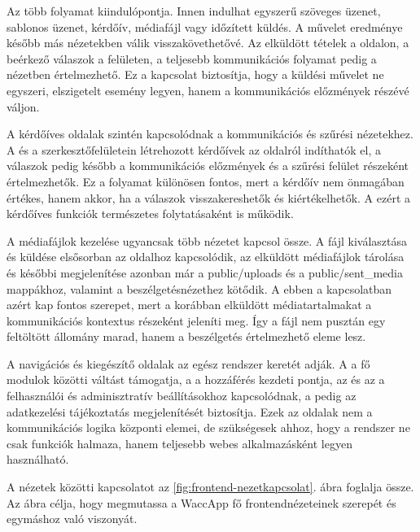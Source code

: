 Az  több folyamat kiindulópontja. Innen indulhat egyszerű szöveges üzenet, sablonos üzenet, kérdőív, médiafájl vagy időzített küldés. A művelet eredménye később más nézetekben válik visszakövethetővé. Az elküldött tételek a  oldalon, a beérkező válaszok a  felületen, a teljesebb kommunikációs folyamat pedig a  nézetben értelmezhető. Ez a kapcsolat biztosítja, hogy a küldési művelet ne egyszeri, elszigetelt esemény legyen, hanem a kommunikációs előzmények részévé váljon. 

A kérdőíves oldalak szintén kapcsolódnak a kommunikációs és szűrési nézetekhez. A  és a  szerkesztőfelületein létrehozott kérdőívek az  oldalról indíthatók el, a válaszok pedig később a kommunikációs előzmények és a szűrési felület részeként értelmezhetők. Ez a folyamat különösen fontos, mert a kérdőív nem önmagában értékes, hanem akkor, ha a válaszok visszakereshetők és kiértékelhetők. A  ezért a kérdőíves funkciók természetes folytatásaként is működik. 

A médiafájlok kezelése ugyancsak több nézetet kapcsol össze. A fájl kiválasztása és küldése elsősorban az  oldalhoz kapcsolódik, az elküldött médiafájlok tárolása és későbbi megjelenítése azonban már a public/uploads és a public/sent\_media mappákhoz, valamint a beszélgetésnézethez kötődik. A  ebben a kapcsolatban azért kap fontos szerepet, mert a korábban elküldött médiatartalmakat a kommunikációs kontextus részeként jeleníti meg. Így a fájl nem pusztán egy feltöltött állomány marad, hanem a beszélgetés értelmezhető eleme lesz. 

A navigációs és kiegészítő oldalak az egész rendszer keretét adják. A  a fő modulok közötti váltást támogatja, a  a hozzáférés kezdeti pontja, az  és az  a felhasználói és adminisztratív beállításokhoz kapcsolódnak, a  pedig az adatkezelési tájékoztatás megjelenítését biztosítja. Ezek az oldalak nem a kommunikációs logika központi elemei, de szükségesek ahhoz, hogy a rendszer ne csak funkciók halmaza, hanem teljesebb webes alkalmazásként legyen használható. 

A nézetek közötti kapcsolatot az \ref{fig:frontend-nezetkapcsolat}. ábra foglalja össze. Az ábra célja, hogy megmutassa a WaccApp fő frontendnézeteinek szerepét és egymáshoz való viszonyát.

